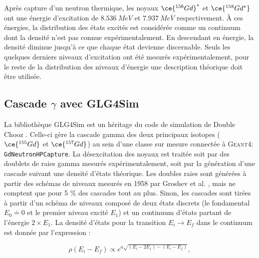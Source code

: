 Après capture d'un neutron thermique, les noyaux $\ce{^{156}Gd}^*$ et $\ce{^{158}Gd^*}$ ont une énergie d'excitation de $\SI{8.536}{MeV}$ et $\SI{7.937}{MeV}$ respectivement. À ces énergies, la distribution des états excités est considérée comme un continuum dont la densité n'est pas connue expérimentalement. En descendant en énergie, la densité diminue jusqu'à ce que chaque état devienne discernable. Seuls les quelques derniers niveaux d'excitation ont été mesurés expérimentalement, pour le reste de la distribution des niveaux d'énergie une description théorique doit être utilisée.

\bigbreak

%


\subsection{Cascade $\gamma$ avec GLG4Sim}

La bibliothèque GLG4Sim est un héritage du code de simulation de Double Chooz \cite{glg4sim_doc}. Celle-ci gère la cascade gamma des deux principaux isotopes ($\ce{^{155}Gd}$ et $\ce{^{157}Gd}$) au sein d'une classe sur mesure connectée à \textsc{Geant4}: \texttt{GdNeutronHPCapture}. La désexcitation des noyaux est traitée soit par des doublets de raies gamma mesurés expérimentalement, soit par la génération d'une cascade suivant une densité d'états théorique. Les doubles raies sont générées à partir des schémas de niveaux mesurés en 1958 par Groshev et al. \cite{Groshev1958}, mais ne comptent que pour 5 \% des cascades tout au plus. Sinon, les cascades sont tirées à partir d'un schéma de niveaux composé de deux états discrets (le fondamental $E_0 \doteq 0$ et le premier niveau excité $E_1$) et un continuum d'états partant de l'énergie $2\times E_1$. La densité d'états pour la transition $E_i \rightarrow E_f$ dans le continuum est donnée par l'expression :

\begin{equation}
    \rho (E_i - E_f) \propto e^{a \sqrt{(E_i - 2E_1) - (E_i - E_f)}},
\end{equation}

